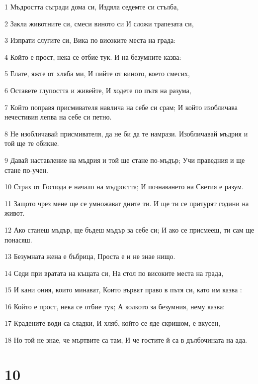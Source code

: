 \par 1 Мъдростта съгради дома си, Издяла седемте си стълба,
\par 2 Закла животните си, смеси виното си И сложи трапезата си,
\par 3 Изпрати слугите си, Вика по високите места на града:
\par 4 Който е прост, нека се отбие тук. И на безумните казва:
\par 5 Елате, яжте от хляба ми, И пийте от виното, което смесих,
\par 6 Оставете глупостта и живейте, И ходете по пътя на разума,
\par 7 Който поправя присмивателя навлича на себе си срам; И който изобличава нечестивия лепва на себе си петно.
\par 8 Не изобличавай присмивателя, да не би да те намрази. Изобличавай мъдрия и той ще те обикне.
\par 9 Давай наставление на мъдрия и той ще стане по-мъдър; Учи праведния и ще стане по-учен.
\par 10 Страх от Господа е начало на мъдростта; И познаването на Светия е разум.
\par 11 Защото чрез мене ще се умножават дните ти. И ще ти се притурят години на живот.
\par 12 Ако станеш мъдър, ще бъдеш мъдър за себе си; И ако се присмееш, ти сам ще понасяш.
\par 13 Безумната жена е бъбрица, Проста е и не знае нищо.
\par 14 Седи при вратата на къщата си, На стол по високите места на града,
\par 15 И кани ония, които минават, Които вървят право в пътя си, като им казва :
\par 16 Който е прост, нека се отбие тук; А колкото за безумния, нему казва:
\par 17 Крадените води са сладки, И хляб, който се яде скришом, е вкусен,
\par 18 Но той не знае, че мъртвите са там, И че гостите й са в дълбочината на ада.

\chapter{10}

